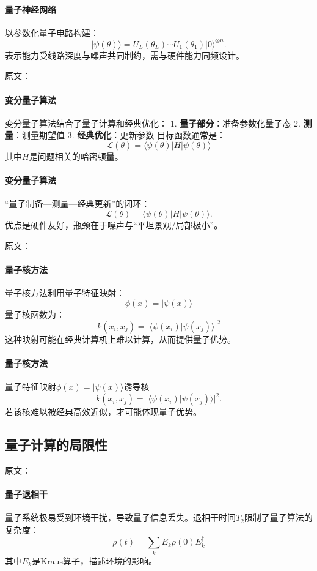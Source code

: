\paragraph{量子神经网络}
以参数化量子电路构建：
$$|\psi(\theta)\rangle=U_L(\theta_L)\cdots U_1(\theta_1)|0\rangle^{\otimes n}.$$
表示能力受线路深度与噪声共同制约，需与硬件能力同频设计。

原文：
\paragraph{变分量子算法}
变分量子算法结合了量子计算和经典优化：
1. \textbf{量子部分}：准备参数化量子态
2. \textbf{测量}：测量期望值
3. \textbf{经典优化}：更新参数
目标函数通常是：
$$\mathcal{L}(\theta) = \langle\psi(\theta)|H|\psi(\theta)\rangle$$
其中$H$是问题相关的哈密顿量。
\paragraph{变分量子算法}
“量子制备—测量—经典更新”的闭环：
$$\mathcal{L}(\theta)=\langle\psi(\theta)|H|\psi(\theta)\rangle.$$
优点是硬件友好，瓶颈在于噪声与“平坦景观/局部极小”。

原文：
\paragraph{量子核方法}
量子核方法利用量子特征映射：
$$\phi(x) = |\psi(x)\rangle$$
量子核函数为：
$$k(x_i, x_j) = |\langle\psi(x_i)|\psi(x_j)\rangle|^2$$
这种映射可能在经典计算机上难以计算，从而提供量子优势。
\paragraph{量子核方法}
量子特征映射$\phi(x)=|\psi(x)\rangle$诱导核
$$k(x_i,x_j)=|\langle\psi(x_i)|\psi(x_j)\rangle|^2.$$
若该核难以被经典高效近似，才可能体现量子优势。

\subsection{量子计算的局限性}

原文：
\paragraph{量子退相干}
量子系统极易受到环境干扰，导致量子信息丢失。退相干时间$T_2$限制了量子算法的复杂度：
$$\rho(t) = \sum_k E_k \rho(0) E_k^\dagger$$
其中$E_k$是Kraus算子，描述环境的影响。

